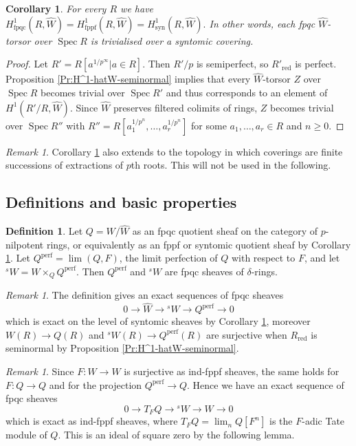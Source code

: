 \documentclass[a4paper,11pt]{amsart}
\theoremstyle{plain}
\newtheorem{Cor}[equation]{Corollary}
\theoremstyle{definition}
\newtheorem{Defn}[equation]{Definition}
\theoremstyle{remark}
\newtheorem{Remark}[equation]{Remark}
\newcommand{\bCo}{\begin{Cor}}
\newcommand{\eCo}{\end{Cor}}
\newcommand{\bDe}{\begin{Defn}}
\newcommand{\eDe}{\end{Defn}}
\newcommand{\bRe}{\begin{Remark}}
\newcommand{\eRe}{\end{Remark}}
\newcommand{\bproof}{\begin{proof}}
\newcommand{\eproof}{\end{proof}}
\newcommand{\beqn}{\begin{equation}}
\newcommand{\eeqn}{\end{equation}}
\numberwithin{equation}{section}
\DeclareMathOperator{\fppf}{fppf}
\DeclareMathOperator{\fpqc}{fpqc}
\DeclareMathOperator{\perf}{perf}
\DeclareMathOperator{\red}{red}
\DeclareMathOperator{\syn}{syn}
\DeclareMathOperator{\Spec}{Spec}
\newcommand{\limperf}{^{\perf}}
\newcommand{\sW}{{}^sW}
\begin{document}
\bCo
\label{Co:H^1-hatW-fpqc-syn}
For every $R$ we have
$
H^1_{\fpqc}(R,\hat W)=H^1_{\fppf}(R,\hat W)=H^1_{\syn}(R,\hat W).
$
In other words, each fpqc $\hat W$-torsor over $\Spec R$ is trivialised over a syntomic covering.
\eCo

\bproof
Let $R'=R[a^{1/p^\infty}|a\in R]$.
Then $R'/p$ is semiperfect, so $R'_{\red}$ is perfect. Proposition \ref{Pr:H^1-hatW-seminormal} implies that every $\hat W$-torsor $Z$ over $\Spec R$ becomes trivial over $\Spec R'$ and thus corresponds to an element of $H^1(R'/R,\hat W)$. Since $\hat W$ preserves filtered colimits of rings, $Z$ becomes trivial over $\Spec R''$ with $R''=R[a_1^{1/p^n}\!\!,\ldots,a_r^{1/p^n}]$ for some $a_1,\ldots,a_r\in R$ and $n\ge 0$.
\eproof

\bRe
Corollary \ref{Co:H^1-hatW-fpqc-syn} also extends to the topology in which coverings are finite successions of extractions of $p$th roots. This will not be used in the following.
\eRe

\subsection{Definitions and basic properties}

\bDe
Let $Q=W/\hat W$ as an fpqc quotient sheaf on the category of $p$-nilpotent rings, or equivalently as an fppf or syntomic quotient sheaf by Corollary \ref{Co:H^1-hatW-fpqc-syn}. 
Let $Q\limperf=\lim(Q,F)$, the limit perfection of $Q$ with respect to $F$, and let $\sW=W\times_QQ\limperf$. Then $Q\limperf$ and $\sW$ are fpqc sheaves of $\delta$-rings. 
\eDe

\bRe
\label{Re:hatW-sW-Qperf}
The definition gives an exact sequences of fpqc sheaves
\beqn
\label{Eq:hatW-sW-Qperf}
0\to\hat W\to\sW\to Q\limperf\to 0
\eeqn
which is exact on the level of syntomic sheaves by Corollary \ref{Co:H^1-hatW-fpqc-syn}, moreover $W(R)\to Q(R)$ and $\sW(R)\to Q\limperf(R)$ are surjective when $R_{\red}$ is seminormal by Proposition \ref{Pr:H^1-hatW-seminormal}.
\eRe

\bRe
\label{Re:TFQ-sW-W}
Since $F\colon W\to W$ is surjective as ind-fppf sheaves, the same holds for $F\colon Q\to Q$ and for the projection $Q\limperf\to Q$. Hence we have an exact sequence of fpqc sheaves
\beqn
\label{Eq:TFQ-sW-W}
0\to T_FQ\to\sW\to W\to 0
\eeqn
which is exact as ind-fppf sheaves, where $T_FQ=\lim_nQ[F^n]$ is the $F$-adic Tate module of $Q$. This is an ideal of square zero by the following lemma. 
\eRe
\end{document}

